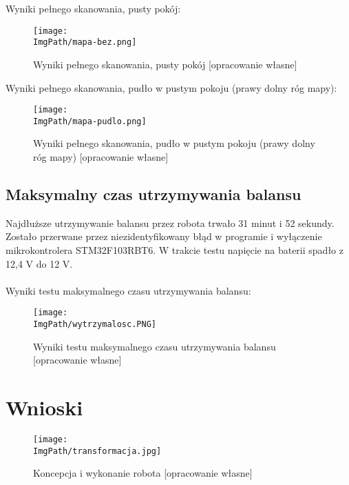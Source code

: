 \documentclass[a4paper,12pt,twoside,openany]{report}
\newcommand{\ImgPath}{.}
\begin{document}
\newpage
\noindent Wyniki pełnego skanowania, pusty pokój:
\begin{figure}[!htbp]
	\begin{center}
\centering
\texttt{[image: \\ImgPath/mapa-bez.png]}
\end{center}
	\caption{Wyniki pełnego skanowania, pusty pokój [opracowanie własne]}
	\label{schematKomunikacji}
\end{figure}

\newpage
\noindent Wyniki pełnego skanowania, pudło w pustym pokoju (prawy dolny róg mapy):
\begin{figure}[!htbp]
	\begin{center}
\centering
\texttt{[image: \\ImgPath/mapa-pudlo.png]}
\end{center}
	\caption{Wyniki pełnego skanowania, pudło w pustym pokoju (prawy dolny róg mapy) [opracowanie własne]}
	\label{schematKomunikacji}
\end{figure}

\newpage
\section{Maksymalny czas utrzymywania balansu}

Najdłuższe utrzymywanie balansu przez robota trwało 31 minut i 52 sekundy. Zostało przerwane przez niezidentyfikowany błąd w programie i wyłączenie mikrokontrolera STM32F103RBT6. W trakcie testu napięcie na baterii spadło z 12,4 V do 12 V.\\
\\
\noindent Wyniki testu maksymalnego czasu utrzymywania balansu:
\begin{figure}[!htbp]
	\begin{center}
\centering
\texttt{[image: \\ImgPath/wytrzymalosc.PNG]}
\end{center}
	\caption{Wyniki testu maksymalnego czasu utrzymywania balansu [opracowanie własne]}
	\label{schematKomunikacji}
\end{figure}

\chapter{Wnioski}

\begin{figure}[!htbp]
	\begin{center}
\centering
\texttt{[image: \\ImgPath/transformacja.jpg]}
\end{center}
	\caption{Koncepcja i wykonanie robota [opracowanie własne]}
	\label{schematKomunikacji}
\end{figure}
\end{document}
